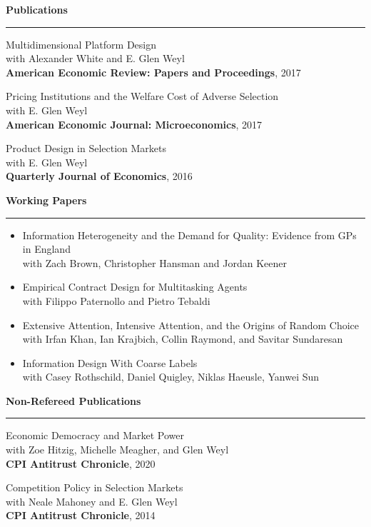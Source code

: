 \documentclass[11pt,a4paper]{article}
\newenvironment{rSection}[1]{%
  \vspace{0.5em}%
  \noindent\textbf{\large #1}%
  \vspace{0.3em}\par
  \hrule
  \vspace{0.5em}
}{%
  \vspace{0.8em}
}
\begin{document}
\begin{rSection}{Publications}
\begin{etaremune}
\item Multidimensional Platform Design \\ 
with Alexander White and E. Glen Weyl \\
\textbf{American Economic Review: Papers and Proceedings}, 2017

\item Pricing Institutions and the Welfare Cost of Adverse Selection \\
with E. Glen Weyl \\
\textbf{American Economic Journal: Microeconomics}, 2017

\item Product Design in Selection Markets \\
with E. Glen Weyl \\ 
\textbf{Quarterly Journal of Economics}, 2016
	
\end{etaremune}
\end{rSection}

\begin{rSection}{Working Papers}
\begin{itemize}
  \item Information Heterogeneity and the Demand for Quality: Evidence from GPs in England \\ 
  with Zach Brown, Christopher Hansman and Jordan Keener

  \item Empirical Contract Design for Multitasking Agents \\ 
  with Filippo Paternollo and Pietro Tebaldi

  \item Extensive Attention, Intensive Attention, and the Origins of Random Choice \\ 
  with Irfan Khan, Ian Krajbich, Collin Raymond, and Savitar Sundaresan

  \item Information Design With Coarse Labels \\ 
  with Casey Rothschild, Daniel Quigley, Niklas Haeusle, Yanwei Sun
\end{itemize}
\end{rSection}

\begin{rSection}{Non-Refereed Publications}
\begin{etaremune}

\item Economic Democracy and Market Power \\ 
with Zoe Hitzig, Michelle Meagher, and Glen Weyl \\ 
\textbf{CPI Antitrust Chronicle}, 2020

\item Competition Policy in Selection Markets \\ 
with Neale Mahoney and E. Glen Weyl \\ 
\textbf{CPI Antitrust Chronicle}, 2014
	
\end{etaremune}
\end{rSection}
\end{document}
